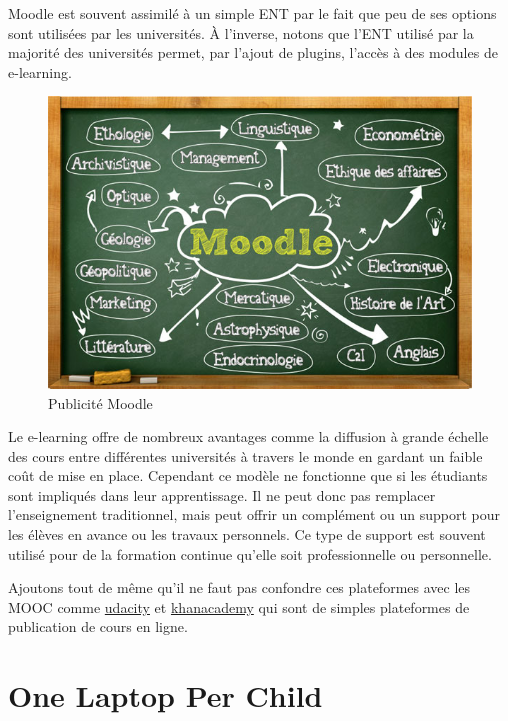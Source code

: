 Moodle est souvent assimilé à un simple ENT par le fait que peu de ses options sont utilisées par les universités. À l'inverse, notons que l'ENT utilisé par la majorité des universités permet, par l'ajout de plugins, l'accès à des modules de e-learning.

\begin{minipage}[H]{\textwidth}
  \begin{figure}[H]
  \centering
  \includegraphics[width=\textwidth]{../resources/illustrations/moodle_rentree_2012}
  \caption{Publicité Moodle}
  \end{figure}
\end{minipage}

Le e-learning offre de nombreux avantages comme la diffusion à grande échelle des cours entre différentes universités à travers le monde en gardant un faible coût de mise en place. Cependant ce modèle ne fonctionne que si les étudiants sont impliqués dans leur apprentissage. Il ne peut donc pas remplacer l'enseignement traditionnel, mais peut offrir un complément ou un support pour les élèves en avance ou les travaux personnels. Ce type de support est souvent utilisé pour de la formation continue qu'elle soit professionnelle ou personnelle.

Ajoutons tout de même qu'il ne faut pas confondre ces plateformes avec
les \gls{MOOC} comme \href{http://www.udacity.com}{udacity} et \href{http://www.khanacademy.org}{khanacademy} qui sont de simples
plateformes de publication de cours en ligne.



\section{One Laptop Per Child}

